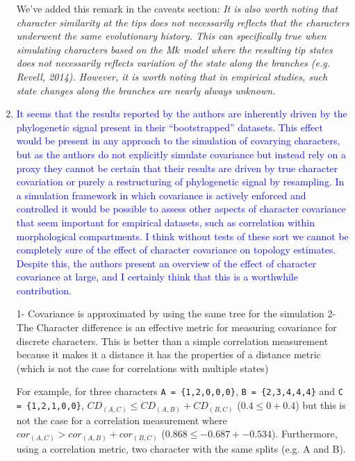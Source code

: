 \documentclass[12pt,letterpaper]{article}
\begin{document}
\begin{enumerate}
We've added this remark in the caveats section:
\textit{It is also worth noting that character similarity at the tips does not necessarily reflects that the characters underwent the same evolutionary history.
This can specifically true when simulating characters based on the M$k$ model where the resulting tip states does not necessarily reflects variation of the state along the branches (e.g. Revell, 2014). However, it is worth noting that in empirical studies, such state changes along the branches are nearly always unknown.}

\item{\textcolor{blue}{It seems that the results reported by the authors are inherently driven by the phylogenetic signal present in their ``bootstrapped'' datasets. This effect would be present in any approach to the simulation of covarying characters, but as the authors do not explicitly simulate covariance but instead rely on a proxy they cannot be certain that their results are driven by true character covariation or purely a restructuring of phylogenetic signal by resampling. In a simulation framework in which covariance is actively enforced and controlled it would be possible to assess other aspects of character covariance that seem important for empirical datasets, such as correlation within morphological compartments. I think without tests of these sort we cannot be completely sure of the effect of character covariance on topology estimates. Despite this, the authors present an overview of the effect of character covariance at large, and I certainly think that this is a worthwhile contribution.}}

1- Covariance is approximated by using the same tree for the simulation
2- The Character difference is an effective metric for measuring covariance for discrete characters. This is better than a simple correlation measurement because it makes it a distance it has the properties of a distance metric (which is not the case for correlations with multiple states)

For example, for three characters \texttt{A = \{1,2,0,0,0\}}, \texttt{B = \{2,3,4,4,4\}} and \texttt{C = \{1,2,1,0,0\}}, $CD_{(A, C)} \leq CD_{(A, B)} + CD_{(B, C)}$ ($0.4 \leq 0 + 0.4$) but this is not the case for a correlation measurement where $cor_{(A, C)} > cor_{(A, B)} + cor_{(B, C)}$ ($0.868 \leq -0.687 + -0.534$). Furthermore, using a correlation metric, two character with the same splits (e.g. A and B).


\end{enumerate}
\end{document}
